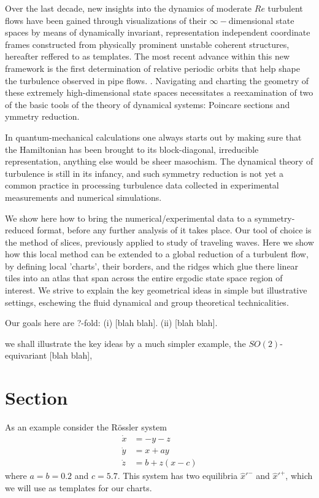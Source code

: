 \documentclass{article}
\begin{document}
Over the last decade, new insights into the dynamics of moderate $Re$ turbulent flows have been gained through visualizations of their $\infty-$dimensional state spaces by means of dynamically invariant, representation independent coordinate frames constructed from physically prominent unstable coherent structures, hereafter reffered to as templates. The most recent advance within this new framework is the first determination of relative periodic orbits that help shape the turbulence observed in pipe flows. \cite{ACHKW11}. Navigating and charting the geometry of these extremely high-dimensional state spaces necessitates a reexamination of two of the basic tools of the theory of dynamical systems: Poincare sections and ymmetry reduction.

In quantum-mechanical calculations one always starts out by making sure that the Hamiltonian has been brought to its block-diagonal, irreducible representation, anything else would be sheer masochism. The dynamical theory of turbulence is still in its infancy, and such symmetry reduction is not yet a common practice in processing turbulence data collected in experimental measurements and numerical simulations.

We show here how to bring the numerical/experimental data to a symmetry-reduced format, before any further analysis of it takes place. Our tool of choice is the method of slices, \cite{rowley_reconstruction_2000,BeTh04,SiCvi10,FrCv11} previously applied to study of traveling waves. Here we show how this local method can be extended to a global reduction of a turbulent flow, by defining local 'charts', their borders, and the ridges which glue there linear tiles into an atlas that span across the entire ergodic state space region of interest. We strive to explain the key geometrical ideas in simple but illustrative settings, eschewing the fluid dynamical and group theoretical technicalities.

Our goals here are ?-fold:
(i)  [blah blah].
(ii) [blah blah].

we shall illustrate the key ideas by a much
simpler example, the $SO(2)$-equivariant  [blah blah],

\section{Section}
\label{s:cut}


As an example consider the R\"ossler system
\begin{align}
\dot{x}&=-y-z\\
\dot{y}&=x+ay\\
\dot{z}&=b+z(x-c)
\end{align}
where $a=b=0.2$ and $c=5.7$. This system has two equilibria $\hat{x}'^{-}$ and $\hat{x}'^{+}$, which we will use as templates for our charts.
\end{document}
